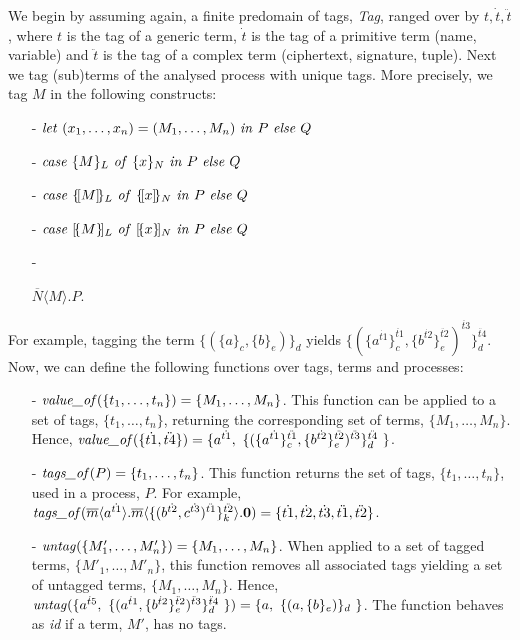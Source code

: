 \documentclass[10pt,a4paper,final,oneside,fleqn]{book}
\begin{document}
We begin by assuming again, a finite predomain of tags, {\itshape Tag\/}, ranged over by $t, \dot{t}, \ddot{t}$, where $t$ is the tag of a generic term, $\dot{t}$ is the tag of a primitive term (name, variable) and $\ddot{t}$ is the tag of a complex term (ciphertext, signature, tuple).  Next we tag (sub)terms of the analysed process with unique tags.  More precisely, we tag $M$ in the following constructs:
\begin{itemize}
\item[-]
$\mbox{{\itshape let\/} }(x_1,\ldots,x_n)=(M_1,\ldots,M_n)\mbox{ {\itshape in\/} }P\mbox{ {\itshape else\/} }Q$
\item[-]
$\mbox{{\itshape case\/} }\{M\}_L\mbox{ {\itshape of\/} }\{x\}_N\mbox{ {\itshape in\/} }P\mbox{ {\itshape else\/} }Q$
\item[-]
$\mbox{{\itshape case\/} }\{\![M]\!\}_L\mbox{ {\itshape of\/} }\{\![x]\!\}_{N}\mbox{ {\itshape in\/} }P\mbox{ {\itshape else\/} }Q$
\item[-]
$\mbox{{\itshape case\/} }[\!\{M\}\!]_L\mbox{ {\itshape of\/} }[\!\{x\}\!]_{N}\mbox{ {\itshape in\/} }P\mbox{ {\itshape else\/} }Q$
\item[-]

$\overline{N}\langle M\rangle.P$.
\end{itemize}
For example, tagging the term $\{(\{a\}_c,\{b\}_e)\}_d$ yields $\{(\{a^{\dot{t1}}\}_c^{\ddot{t1}},\{b^{\dot{t2}}\}_e^{\ddot{t2}})^{\ddot{t3}}\}_d^{\ddot{t4}}$. Now, we can define the following functions over tags, terms and processes:
\begin{itemize}
\item[-]
$\mbox{{\itshape value\_of\/}}(\{t_1,\ldots,t_n\})=\{M_1,\ldots,M_n\}$.  This function can be applied to a set of tags, $\{t_1,\ldots,t_n\}$, returning the corresponding set of terms, $\{M_1,\ldots,M_n\}$.  Hence, $\mbox{{\itshape value\_of\/}}(\{\dot{t1}, \ddot{t4}\})=\{a^{\dot{t1}},~\{(\{a^{\dot{t1}}\}_c^{\ddot{t1}},\{b^{\dot{t2}}\}_e^{\ddot{t2}})^{\ddot{t3}}\}_d^{\ddot{t4}}~\}$.
\item[-]
$\mbox{{\itshape tags\_of\/}}(P)=\{t_1,\ldots,t_n\}$.  This function returns the set of tags, $\{t_1,\ldots,t_n\}$, used in a process, $P$.  For example, $\mbox{{\itshape tags\_of\/}}(\overline{m}\langle a^{\dot{t1}}\rangle. \overline{m}\langle\{(b^{\dot{t2}},c^{\dot{t3}})^{\ddot{t1}}\}^{\ddot{t2}}_k\rangle.{\bf 0})=\{\dot{t1},\dot{t2},\dot{t3},\ddot{t1},\ddot{t2}\}$.
\item[-]
$\mbox{{\itshape untag\/}}(\{M'_1,\ldots,M'_n\})=\{M_1,\ldots,M_n\}$. When applied to a set of tagged terms, $\{M'_1,\ldots,M'_n\}$, this function removes all associated tags yielding a set of untagged terms, $\{M_1,\ldots,M_n\}$. Hence, $\mbox{{\itshape untag\/}}(\{a^{\dot{t}5},~\{(a^{\dot{t}1},\{b^{\dot{t}2}\}_e^{\ddot{t}2})^{\ddot{t}3}\}_d^{\ddot{t}4}~\})=\{a,~\{(a,\{b\}_e)\}_d~\}$. The function behaves as {\itshape id\/} if a term, $M'$, has no tags.
\end{itemize}
\end{document}
